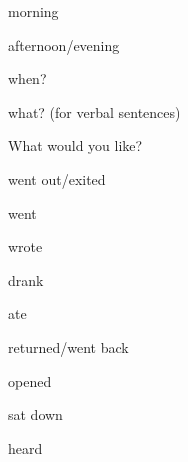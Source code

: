 \documentclass[avery5371,grid,frame]{flashcards}
\begin{document}
\begin{flashcard}{\LARGE morning}
\LARGE {}
\end{flashcard}
\begin{flashcard}{\LARGE afternoon/evening}
\LARGE {}
\end{flashcard}
\begin{flashcard}{\LARGE when?}
\LARGE {}
\end{flashcard}
\begin{flashcard}{\LARGE what? (for verbal sentences)}
\LARGE {}
\end{flashcard}
\begin{flashcard}{\LARGE What would you like?}
\LARGE {}
\end{flashcard}
\begin{flashcard}{\LARGE went out/exited}
\LARGE {}
\end{flashcard}
\begin{flashcard}{\LARGE went}
\LARGE {}
\end{flashcard}
\begin{flashcard}{\LARGE wrote}
\LARGE {}
\end{flashcard}
\begin{flashcard}{\LARGE drank}
\LARGE {}
\end{flashcard}
\begin{flashcard}{\LARGE ate}
\LARGE {}
\end{flashcard}
\begin{flashcard}{\LARGE returned/went back}
\LARGE {}
\end{flashcard}
\begin{flashcard}{\LARGE opened}
\LARGE {}
\end{flashcard}
\begin{flashcard}{\LARGE sat down}
\LARGE {}
\end{flashcard}
\begin{flashcard}{\LARGE heard}
\LARGE {}
\end{flashcard}
\end{document}
